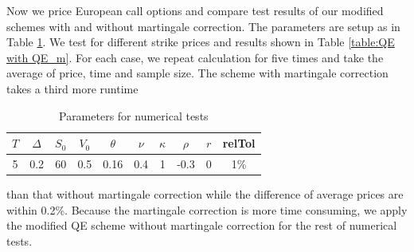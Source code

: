 \documentclass{ws-ijfe}
\begin{document}
Now we price European call options and compare test results of our modified schemes with and without martingale correction. The parameters are setup as in Table \ref{tab:params setup}. We test for different strike prices and results shown in Table \ref{table:QE with QE_m}. For each case, we repeat calculation for five times and take the average of price, time and sample size. The scheme with martingale correction takes a third more runtime
\begin{table}[h]
 \caption{Parameters for numerical tests} %
 \centering                          %
 \begin{tabular}{cccccccccc}          %
 \hline\hline                        %
 $T$ & $\Delta$ & $S_0$ & $V_0$ & $\theta$ & $\nu$ & $\kappa$ & $\rho$ & $r$ & relTol\\ [0.5ex]
 \hline                                      %
 5  & 0.2 & 60 & 0.5 & 0.16 & 0.4 &1 & -0.3& 0 & 1\%\\[1ex] %
 \hline                                       %
 \end{tabular}
 \label{tab:params setup}
\end{table}
\begin{table}[h]
\caption{Compare modified QE with modified QE\_m}
\label{table:QE with QE_m}
\centering
{}
\end{table}
than that without martingale correction while the difference of average prices are within 0.2\%. Because the martingale correction is more time consuming, we apply the modified QE scheme without martingale correction for the rest of numerical tests.
\end{document}
